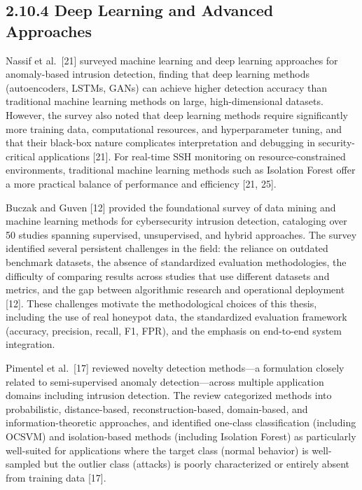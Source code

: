 \documentclass[
  a4paper]{report}
\begin{document}
\subsection{2.10.4 Deep Learning and Advanced
Approaches}\label{deep-learning-and-advanced-approaches}

Nassif et al.~{[}21{]} surveyed machine learning and deep learning
approaches for anomaly-based intrusion detection, finding that deep
learning methods (autoencoders, LSTMs, GANs) can achieve higher
detection accuracy than traditional machine learning methods on large,
high-dimensional datasets. However, the survey also noted that deep
learning methods require significantly more training data, computational
resources, and hyperparameter tuning, and that their black-box nature
complicates interpretation and debugging in security-critical
applications {[}21{]}. For real-time SSH monitoring on
resource-constrained environments, traditional machine learning methods
such as Isolation Forest offer a more practical balance of performance
and efficiency {[}21, 25{]}.

Buczak and Guven {[}12{]} provided the foundational survey of data
mining and machine learning methods for cybersecurity intrusion
detection, cataloging over 50 studies spanning supervised, unsupervised,
and hybrid approaches. The survey identified several persistent
challenges in the field: the reliance on outdated benchmark datasets,
the absence of standardized evaluation methodologies, the difficulty of
comparing results across studies that use different datasets and
metrics, and the gap between algorithmic research and operational
deployment {[}12{]}. These challenges motivate the methodological
choices of this thesis, including the use of real honeypot data, the
standardized evaluation framework (accuracy, precision, recall, F1,
FPR), and the emphasis on end-to-end system integration.

Pimentel et al.~{[}17{]} reviewed novelty detection methods---a
formulation closely related to semi-supervised anomaly
detection---across multiple application domains including intrusion
detection. The review categorized methods into probabilistic,
distance-based, reconstruction-based, domain-based, and
information-theoretic approaches, and identified one-class
classification (including OCSVM) and isolation-based methods (including
Isolation Forest) as particularly well-suited for applications where the
target class (normal behavior) is well-sampled but the outlier class
(attacks) is poorly characterized or entirely absent from training data
{[}17{]}.
\end{document}
